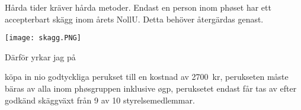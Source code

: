 \documentclass[../_main/handlingar.tex]{subfiles}
\begin{document}
Hårda tider kräver hårda metoder. Endast en person inom phøset har ett accepterbart skägg inom årets
NollU. Detta behöver återgärdas genast. 

\begin{center}
	\texttt{[image: skagg.PNG]}
\end{center}

Därför yrkar jag på
\begin{attsatser}
	\att köpa in nio godtyckliga perukset till en kostnad av \SI{2700}{kr},
	\att perukseten måste bäras av alla inom phøsgruppen inklusive øgp,
	\att peruksetet endast får tas av efter godkänd skäggväxt från 9 av 10 styrelsemedlemmar.
\end{attsatser}

\begin{signatures}{1}
	\mvh
	\signature{Anonym}{}
\end{signatures}
\end{document}
